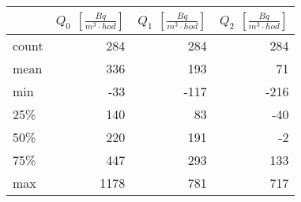 \begin{tabular}{lrrr}
\toprule
{} &  $Q_0$ $\left[\si{\frac{Bq}{m^3\cdot hod}}\right]$ &  $Q_1$ $\left[\si{\frac{Bq}{m^3\cdot hod}}\right]$ &  $Q_2$ $\left[\si{\frac{Bq}{m^3\cdot hod}}\right]$ \\
\midrule
count &                                                284 &                                                284 &                                                284 \\
mean  &                                                336 &                                                193 &                                                 71 \\
min   &                                                -33 &                                               -117 &                                               -216 \\
25\%   &                                                140 &                                                 83 &                                                -40 \\
50\%   &                                                220 &                                                191 &                                                 -2 \\
75\%   &                                                447 &                                                293 &                                                133 \\
max   &                                               1178 &                                                781 &                                                717 \\
\bottomrule
\end{tabular}
